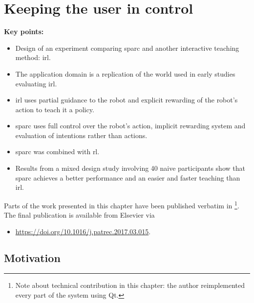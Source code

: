 \chapter{Keeping the user in control}\label{chap:control}
\glsresetall
\graphicspath{{images/control/}}

\newcommand{\nosemic}{\SetEndCharOfAlgoLine{\relax}}%
\newcommand{\dosemic}{\SetEndCharOfAlgoLine{\string;}}%
\newcommand{\pushline}{\Indp}%
\newcommand{\popline}{\Indm\dosemic}%

\begin{framed}
	\textbf{Key points:}
	
	\begin{itemize}
		\item Design of an experiment comparing \acrshort{sparc} and another interactive teaching method: \acrshort{irl}.
		\item The application domain is a replication of the world used in early studies evaluating \acrshort{irl}.
		\item \acrshort{irl} uses partial guidance to the robot and explicit rewarding of the robot's action to teach it a policy.
		\item \acrshort{sparc} uses full control over the robot's action, implicit rewarding system and evaluation of intentions rather than actions.
		\item \acrshort{sparc} was combined with \acrlong{rl}.
		\item Results from a mixed design study involving 40 naive participants show that \acrshort{sparc} achieves a better performance and an easier and faster teaching than \acrshort{irl}.
	\end{itemize}
\end{framed}

Parts of the work presented in this chapter have been published verbatim in \cite{senft2017supervised} \footnote{Note about technical contribution in this chapter: the author reimplemented every part of the system using Qt.}. The final publication is available from Elsevier via
\begin{itemize}
	\item \url{https://doi.org/10.1016/j.patrec.2017.03.015}.
\end{itemize} 

\newpage
\section{Motivation}

